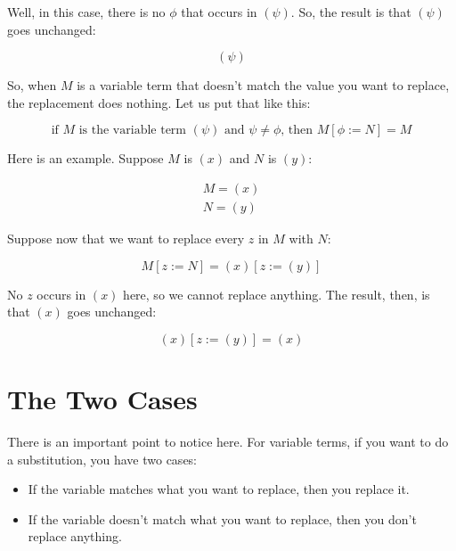 \documentclass{book}
\numberwithin{equation}{chapter}
\begin{document}
\noindent
Well, in this case, there is no $\phi$ that occurs in $(\psi)$. So, the result is that $(\psi)$ goes unchanged:

\begin{equation}
(\psi)
\end{equation}

\noindent
So, when $M$ is a variable term that doesn't match the value you want to replace, the replacement does nothing. Let us put that like this:

\begin{equation}
\text{if $M$ is the variable term $(\psi)$ and $\psi \not = \phi$, then $M[\phi := N] = M$}
\end{equation}

\noindent
Here is an example. Suppose $M$ is $(x)$ and $N$ is $(y)$:

\begin{align}
M = (x) \\
N = (y)
\end{align}

\noindent
Suppose now that we want to replace every $z$ in $M$ with $N$:

\begin{equation}
M[z := N] = (x)[z := (y)]
\end{equation}

\noindent
No $z$ occurs in $(x)$ here, so we cannot replace anything. The result, then, is that $(x)$ goes unchanged:

\begin{equation}
(x)[z := (y)] = (x)
\end{equation}


\section{The Two Cases}

There is an important point to notice here. For variable terms, if you want to do a substitution, you have two cases:

\begin{itemize}
\item{If the variable matches what you want to replace, then you replace it.}
\item{If the variable doesn't match what you want to replace, then you don't replace anything.}
\end{itemize}
\end{document}
